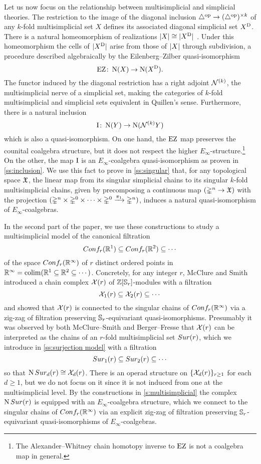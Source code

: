 Let us now focus on the relationship between multisimplicial and simplicial theories.
The restriction to the image of the diagonal inclusion $\triangle^{\mathrm{op}} \to (\triangle^{\mathrm{op}})^{\times k}$ of any $k$-fold multisimplicial set $X$ defines its associated diagonal simplicial set $X^{\mathrm{D}}$.
There is a natural homeomorphism of realizations $\lvert X\rvert \cong \lvert X^{\mathrm{D}}\rvert$
\cite{quillen2010higheralgktheory}.
Under this homeomorphism the cells of $\lvert X^{\mathrm{D}}\rvert$ arise from those of $\lvert X\rvert$ through subdivision, a procedure described algebraically by the Eilenberg--Zilber quasi-isomorphism
\[
\operatorname{EZ} \colon \operatorname{N}(X) \to \operatorname{N}(X^{\mathrm{D}}).
\]
The functor induced by the diagonal restriction has a right adjoint $\mathcal{N}^{(k)}$, the multisimplicial nerve of a simplicial set, making the categories of $k$-fold multisimplicial and simplicial sets equivalent in Quillen's sense.
Furthermore, there is a natural inclusion
\[
\operatorname{I} \colon \operatorname{N}(Y) \to \operatorname{N}(\mathcal{N}^{(k)} Y)
\]
which is also a quasi-isomorphism.
On one hand, the $\operatorname{EZ}$ map preserves the counital coalgebra structure, but it does not respect the higher $E_\infty$-structure.\footnote{The Alexander--Whitney chain homotopy inverse to $\operatorname{EZ}$ is not a coalgebra map in general.}
On the other, the map $\operatorname{I}$ is an $E_\infty$-coalgebra quasi-isomorphism as proven in \cref{ss:inclusion}.
We use this fact to prove in \cref{ss:singular} that, for any topological space $\mathfrak{X}$, the linear map from its singular simplicial chains to its singular $k$-fold multisimplicial chains, given by precomposing a continuous map $(\mathbb{\Delta}^n \to \mathfrak{X})$ with the projection $(\mathbb{\Delta}^n \times \mathbb{\Delta}^{0}\times\dots\times\mathbb{\Delta}^{0} \xrightarrow{\pi_1} \mathbb{\Delta}^n)$, induces a natural quasi-isomorphism of $E_\infty$-coalgebras.

In the second part of the paper, we use these constructions to study a multisimplicial model of the canonical filtration
\[
Conf_{r}(\mathbb{R}^{1}) \subseteq Conf_{r}(\mathbb{R}^{2}) \subseteq \dotsb
\]
of the space $Conf_{r}(\mathbb{R}^{\infty})$ of $r$ distinct ordered points in $\mathbb{R}^\infty = \operatorname*{colim} (\mathbb{R}^1 \subseteq \mathbb{R}^2 \subseteq \dotsb)$.
Concretely, for any integer $r$, McClure and Smith \cite{mcclure2003multivariable} introduced a chain complex $\mathcal{X}(r)$ of $\mathbb{Z}[\mathbb{S}_r]$-modules with a filtration
\[
\mathcal{X}_{1}(r) \subseteq \mathcal{X}_{2}(r) \subseteq \dotsb
\]
and showed that $\mathcal{X}(r)$ is connected to the singular chains of $Conf_{r}(\mathbb{R}^{\infty})$ via a zig-zag of filtration preserving $\mathbb{S}_r$-equivariant quasi-isomorphisms.
Presumably it was observed by both McClure--Smith and Berger--Fresse that $\mathcal{X}(r)$ can be interpreted as the chains of an $r$-fold multisimplicial set $Sur(r)$, which we introduce in \cref{ss:surjection model} with a filtration
\[
Sur_{1}(r) \subseteq Sur_{2}(r) \subseteq \dotsb
\]
so that $\operatorname{N}Sur_{d}(r) \cong \mathcal{X}_{d}(r)$.
There is an operad structure on $\{\mathcal{X}_{d}(r)\}_{r \geq 1}$ for each $d \geq 1$, but we do not focus on it since it is not induced from one at the multisimplicial level.
By the constructions in \cref{s:multisimplicial} the complex $\operatorname{N}Sur(r)$ is equipped with an $E_\infty$-coalgebra structure, which we connect to the singular chains of $Conf_{r}(\mathbb{R}^{\infty})$ via an explicit zig-zag of filtration preserving $\mathbb{S}_r$-equivariant quasi-isomorphisms of $E_\infty$-coalgebras.


